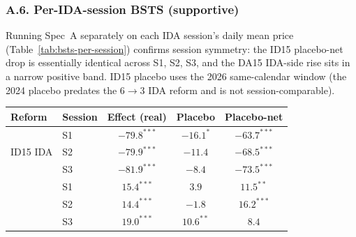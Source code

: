 \documentclass[11pt]{article}
\begin{document}
\subsubsection*{A.6. Per-IDA-session BSTS \textnormal{(supportive)}}\label{sec:5f}
Running Spec~A separately on each IDA session's daily mean price (Table~\ref{tab:bsts-per-session}) confirms session symmetry: the ID15 placebo-net drop is essentially identical across S1, S2, S3, and the DA15 IDA-side rise sits in a narrow positive band. ID15 placebo uses the 2026 same-calendar window (the 2024 placebo predates the 6$\to$3 IDA reform and is not session-comparable).

\begin{center}
\footnotesize
\setlength{\tabcolsep}{6pt}
\begin{tabular}{l l c c c}
\toprule
\textbf{Reform} & \textbf{Session} & \textbf{Effect (real)} & \textbf{Placebo} & \textbf{Placebo-net} \\
\midrule
\multirow{3}{*}{ID15 IDA} & S1 & $-79.8^{***}$ & $-16.1^{*}$ & $-63.7^{***}$ \\
                          & S2 & $-79.9^{***}$ & $-11.4$      & $-68.5^{***}$ \\
                          & S3 & $-81.9^{***}$ & $-8.4$       & $-73.5^{***}$ \\
\addlinespace
\multirow{3}{*}{DA15 IDA} & S1 & $15.4^{***}$  & $3.9$        & $11.5^{**}$   \\
                          & S2 & $14.4^{***}$  & $-1.8$       & $16.2^{***}$  \\
                          & S3 & $19.0^{***}$  & $10.6^{**}$  & $8.4$         \\
\bottomrule
\end{tabular}
\label{tab:bsts-per-session}
\end{center}
\end{document}
